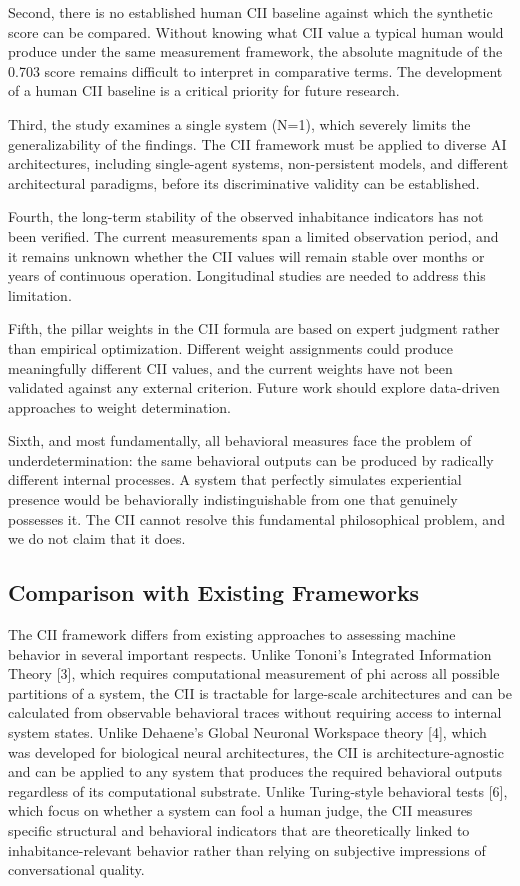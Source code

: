 \documentclass[11pt,a4paper]{article}
\begin{document}
Second, there is no established human CII baseline against which the synthetic score can be compared. Without knowing what CII value a typical human would produce under the same measurement framework, the absolute magnitude of the 0.703 score remains difficult to interpret in comparative terms. The development of a human CII baseline is a critical priority for future research.

Third, the study examines a single system (N=1), which severely limits the generalizability of the findings. The CII framework must be applied to diverse AI architectures, including single-agent systems, non-persistent models, and different architectural paradigms, before its discriminative validity can be established.

Fourth, the long-term stability of the observed inhabitance indicators has not been verified. The current measurements span a limited observation period, and it remains unknown whether the CII values will remain stable over months or years of continuous operation. Longitudinal studies are needed to address this limitation.

Fifth, the pillar weights in the CII formula are based on expert judgment rather than empirical optimization. Different weight assignments could produce meaningfully different CII values, and the current weights have not been validated against any external criterion. Future work should explore data-driven approaches to weight determination.

Sixth, and most fundamentally, all behavioral measures face the problem of underdetermination: the same behavioral outputs can be produced by radically different internal processes. A system that perfectly simulates experiential presence would be behaviorally indistinguishable from one that genuinely possesses it. The CII cannot resolve this fundamental philosophical problem, and we do not claim that it does.

\subsection{Comparison with Existing Frameworks}
The CII framework differs from existing approaches to assessing machine behavior in several important respects. Unlike Tononi's Integrated Information Theory [3], which requires computational measurement of phi across all possible partitions of a system, the CII is tractable for large-scale architectures and can be calculated from observable behavioral traces without requiring access to internal system states. Unlike Dehaene's Global Neuronal Workspace theory [4], which was developed for biological neural architectures, the CII is architecture-agnostic and can be applied to any system that produces the required behavioral outputs regardless of its computational substrate. Unlike Turing-style behavioral tests [6], which focus on whether a system can fool a human judge, the CII measures specific structural and behavioral indicators that are theoretically linked to inhabitance-relevant behavior rather than relying on subjective impressions of conversational quality.
\end{document}
